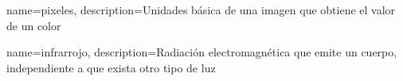 
 {
 name={pixeles},
 description={Unidades b\'asica de una imagen que obtiene el valor de un color}
 }
 
 {
 name={infrarrojo},
 description={Radiación electromagnética que emite un cuerpo, independiente a que exista otro tipo de luz}
 }